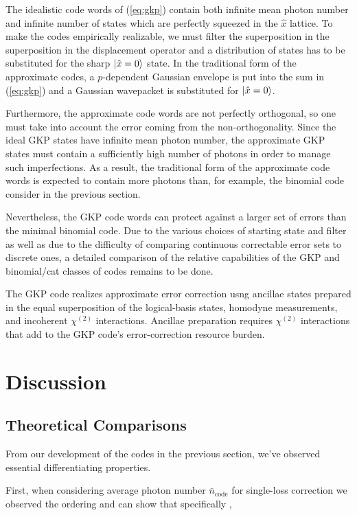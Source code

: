 \documentclass[12]{amsart}
\newcommand\0{\mathbf{0}}
\newcommand\<{\langle}
\renewcommand\>{\rangle}
\begin{document}
The idealistic code words of (\ref{eq:gkp}) contain both infinite mean photon number and infinite number of states which are perfectly squeezed in the $\hat{x}$ lattice. To make the codes empirically realizable, we must filter the superposition in the superposition in the displacement operator and a distribution of states has to be substituted for the sharp $\ket{\hat{x}=0}$ state. In the traditional form of the approximate codes, a $p$-dependent Gaussian envelope is put into the sum in (\ref{eq:gkp}) and a Gaussian wavepacket is substituted for $\ket{\hat{x}=0}$. 

Furthermore, the approximate code words are not perfectly orthogonal, so one must take into account the error coming from the non-orthogonality. Since the ideal GKP states have infinite mean photon number, the approximate GKP states must contain a sufficiently high number of photons in order to manage such imperfections. As a result, the traditional form of the approximate code words is expected to contain more photons than, for example, the binomial code consider in the previous section.

Nevertheless, the GKP code words can protect against a larger set of errors than the minimal binomial code. Due to the various choices of starting state and filter as well as due to the difficulty of comparing continuous correctable error sets to discrete ones, a detailed comparison of the relative capabilities of the GKP and binomial/cat classes of codes remains to be done.

The GKP code realizes approximate error correction usng ancillae states prepared in the equal superposition of the logical-basis states, homodyne measurements, and incoherent $\chi^{(2)}$ interactions. Ancillae preparation requires $\chi^{(2)}$ interactions that add to the GKP code’s error-correction resource burden\cite{niu2018hardware}.

\section{Discussion}

\subsection{Theoretical Comparisons}

From our development of the codes in the previous section, we've observed essential differentiating properties.

First, when considering average photon number $\bar{n}_{\text{code}}$ for single-loss correction we observed the ordering and can show that specifically \cite{michael2016new},
\end{document}
